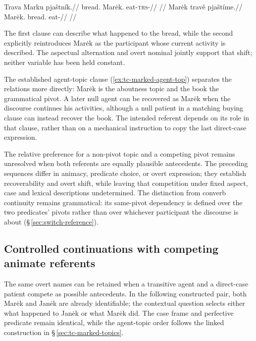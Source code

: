 \pex
\a
\begingl
\gla Trava Marku pjaštník.//
\glb bread.\Dir{} Marėk.\Trs{} eat-\textsc{trs}-\Pf{}//
\glft {}//
\endgl
\a
\begingl
\gla Marėk travě pjaštíme.//
\glb Marėk.\Dir{} bread.\Ind{} eat-\Prog{}//
\glft {} //
\endgl
\xe

\noindent The first clause can describe what happened to the bread, while
 the second explicitly reintroduces Marėk as the participant whose current
 activity is described. The aspectual alternation and overt nominal jointly
 support that shift; neither variable has been held constant.

The established agent-topic clause 
 (\ref{ex:tc-marked-agent-top}) separates the relations more directly:
 Marėk is the aboutness topic and the book the grammatical pivot. A later null
 agent can be recovered as Marėk when the discourse continues his activities,
 although a null patient in a matching buying clause can instead recover the
 book. The intended referent depends on its role in that clause, rather than
 on a mechanical instruction to copy the last direct-case expression.

The relative preference for a non-pivot topic and a competing pivot remains
 unresolved when both referents are equally plausible antecedents. The
 preceding sequences differ in animacy, predicate choice, or overt expression;
 they establish recoverability and overt shift, while leaving that competition
 under fixed aspect, case and lexical descriptions undetermined. The
 distinction from converb continuity remains grammatical: its same-pivot dependency is defined over the two
 predicates' pivots rather than over whichever participant the discourse is
 about (§\,\ref{sec:switch-reference}).

\subsection{Controlled continuations with competing animate referents}
\label{sec:disc-controlled-continuations}

The same overt names can be retained when a transitive agent and a
 direct-case patient compete as possible antecedents. In the following
 constructed pair, both Marėk and Janėk are already identifiable; the
 contextual question selects either what happened to Janėk or what Marėk did.
 The case frame and perfective predicate remain identical, while the
 agent-topic order follows the linked construction in
 §\,\ref{sec:tc-marked-topics}.

